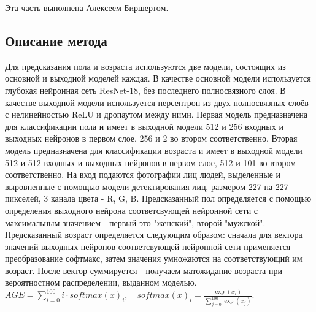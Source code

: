 Эта часть выполнена Алексеем Биршертом. \\

\subsection{Описание метода}\label{subsec:описание-метода}
Для предсказания пола и возраста используются две модели, состоящих из основной и выходной моделей каждая.
В качестве основной модели используется глубокая нейронная сеть ResNet-18, без последнего полносвязного слоя.
В качестве выходной модели используется персептрон из двух полносвязных слоёв с нелинейностью ReLU и дропаутом между ними.
Первая модель предназначена для классификации пола и имеет в выходной модели 512 и 256 входных и выходных нейронов в первом слое, 256 и 2 во втором соответственно.
Вторая модель предназначена для классификации возраста и имеет в выходной модели 512 и 512 входных и выходных нейронов в первом слое, 512 и 101 во втором соответственно.
На вход подаются фотографии лиц людей, выделенные и выровненные с помощью модели детектирования лиц,
размером 227 на 227 пикселей, 3 канала цвета - R, G, B\@.
Предсказанный пол определяется с помощью определения выходного нейрона соответсвующей нейронной сети с максимальным значением -
первый это "женский", второй "мужской".
Предсказанный возраст определяется следующим образом: сначала для вектора значений выходных нейронов
соответсвующей нейронной сети применяется преобразование софтмакс, затем значения умножаются на соответствующий
им возраст.
После вектор суммируется - получаем матожидание возраста при вероятностном распределении, выданном моделью.
$AGE = \sum\limits_{i = 0}^{100}i \cdot softmax(x)_i, \quad softmax(x)_i = \frac{\exp(x_i)}{\sum\limits_{j =
0}^{100}\exp(x_j)}$.

